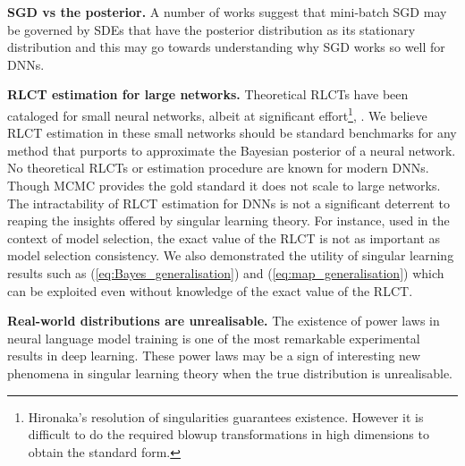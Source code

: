 \documentclass{article} %
\begin{document}
\textbf{SGD vs the posterior.} A number of works \citep{Simsekli17,mandt_stochastic_2018,smith_stochastic_2018} suggest that mini-batch SGD may be governed by SDEs that have the posterior distribution as its stationary distribution and this may go towards understanding why SGD works so well for DNNs. %

\textbf{RLCT estimation for large networks.} 
Theoretical RLCTs have been cataloged for small neural networks, albeit at significant effort\footnote{Hironaka's resolution of singularities guarantees existence. However it is difficult to do the required blowup transformations in high dimensions to obtain the standard form.}, \citep{aoyagi_stochastic_2005, aoyagi_resolution_2006}. We believe RLCT estimation in these small networks should be standard benchmarks for any method that purports to approximate the Bayesian posterior of a neural network.
No theoretical RLCTs or estimation procedure are known for modern DNNs. Though MCMC provides the gold standard it does not scale to large networks.
The intractability of RLCT estimation for DNNs is not a significant deterrent to reaping the insights offered by singular learning theory. For instance, used in the context of model selection, the exact value of the RLCT is not as important as model selection consistency. We also demonstrated the utility of singular learning results such as (\ref{eq:Bayes_generalisation}) and (\ref{eq:map_generalisation}) which can be exploited even without knowledge of the exact value of the RLCT.

\textbf{Real-world distributions are unrealisable.}
The existence of power laws in neural language model training \citep{hestness_2017,kaplan2020scaling} is one of the most remarkable experimental results in deep learning. These power laws may be a sign of interesting new phenomena in singular learning theory when the true distribution is unrealisable.


\end{document}
